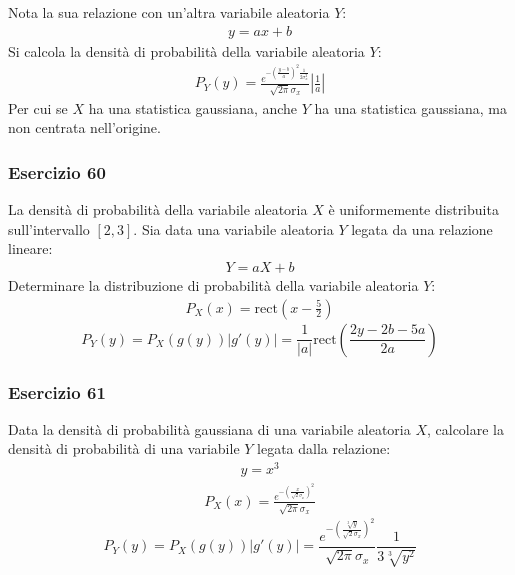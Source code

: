 \documentclass{article}
\newcommand{\rect}{\mathrm{rect}}
\begin{document}
Nota la sua relazione con un'altra variabile aleatoria $Y$:
\begin{gather*}
    y=ax+b
\end{gather*}
Si calcola la densità di probabilità della variabile aleatoria $Y$:
\begin{gather}
    P_Y(y)=\displaystyle\frac{e^{-\left(\frac{y-b}{a}\right)^2\frac{1}{2\sigma_x^2}}}{\sqrt{2\pi}\sigma_x}\left|\frac{1}{a}\right|
\end{gather}
Per cui se $X$ ha una statistica gaussiana, anche $Y$ ha una statistica gaussiana, ma non centrata nell'origine. 

\subsubsection*{Esercizio 60}

La densità di probabilità della variabile aleatoria $X$ è uniformemente distribuita sull'intervallo $[2,3]$. Sia data una variabile aleatoria $Y$ legata da una relazione 
lineare:
\begin{gather*}
    Y=aX+b
\end{gather*}
Determinare la distribuzione di probabilità della variabile aleatoria $Y$:
\begin{gather*}
    P_X(x)=\rect\left(x-\displaystyle\frac{5}{2}\right)
\end{gather*}
\begin{equation}
    P_Y(y)=P_X(g(y))|g'(y)|=\displaystyle\frac{1}{|a|}\rect\left(\frac{2y-2b-5a}{2a}\right)
\end{equation}

\subsubsection*{Esercizio 61}

Data la densità di probabilità gaussiana di una variabile aleatoria $X$, calcolare la densità di probabilità di una variabile $Y$ legata dalla relazione:
\begin{gather*}
    y=x^3
\end{gather*}
\begin{gather*}
    P_X(x)=\displaystyle\frac{e^{-\left(\frac{x}{\sqrt{2}{\sigma_x}}\right)^2}}{\sqrt{2\pi}\sigma_x}
\end{gather*}
\begin{equation}
    P_Y(y)=P_X(g(y))|g'(y)|=\displaystyle\frac{e^{-\left(\frac{\sqrt[3]{y}}{\sqrt{2}{\sigma_x}}\right)^2}}{\sqrt{2\pi}\sigma_x}\frac{1}{3\sqrt[3]{y^2}}
\end{equation}
\end{document}

